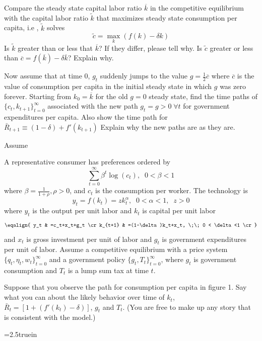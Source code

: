  Compare the steady state capital labor ratio $\overline{k}$ in the competitive equilibrium with the capital labor ratio $\tilde{k}$ that maximizes steady state consumption per capita, i.e ,
 $\tilde{k}$ solves $$\tilde{c}=\max_k \left( f(k)-\delta k \right) $$
Is $\tilde{k}$ greater than or less that $\overline{k}$? If they differ, please tell why. Is $\tilde{c}$ greater or less than $\overline{c} = f(\overline{k})-\delta  \overline{k}$? Explain why.
\medskip

 Now assume that at time 0, $g_t$ suddenly jumps to the value $g={\frac{1}{2}}\overline{c}$ where
$\overline{c}$ is the value of consumption per capita in the initial steady state in which $g$ was zero forever. Starting from $k_0 = \overline{k}$ for the old $g=0$ steady state, find the time paths of $\{c_t,k_{t+1}\}_{t=0}^\infty$ associated with the new path $g_t=g>0 \; \forall t$ for government expenditures per capita.
Also show the time path for $\bar R_{t+1} \equiv (1-\delta) + f'(k_{t+1})$
Explain why the new paths are as they are.



\medskip
{}
\medskip
\noindent
 Assume

 A representative consumer has preferences ordered by
 $$ \sum_{t=0}^\infty \beta^t \log(c_t), \;\;  0< \beta<1$$
 where $\beta = {\frac{1}{1+\rho}}, \rho>0$, and $c_t$ is the consumption per worker.
The technology is $$ y_t=f(k_t)=zk_t^\alpha, \;\; 0<\alpha<1, \;\; z>0 $$
where $y_t$ is the output per unit labor and $k_t$ is capital per unit labor
$$\eqalign{
y_t & =c_t+x_t+g_t \cr
  k_{t+1} & =(1-\delta)k_t+x_t, \;\;  0 < \delta<1 \cr
}$$
and $x_t$ is  gross investment per unit of labor and $g_t$ is  government expenditures per unit of labor.
Assume a competitive equilibrium with a price system $\{q_t,\eta_t,w_t\}_{t=0}^\infty$ and a government policy $\{g_t,T_t\}_{t=0}^\infty$, where
$g_t$ is government consumption and $T_t$ is a lump sum tax at time $t$.


Suppose that you observe the path for consumption per capita in figure 1. Say what you can about the likely behavior over time of $k_t$, $\bar R_t =[1 + (f'(k_t)-\delta)]$, $g_t$ and $T_t$. (You are free to make up any story that is consistent with the model.)

\medskip


\centerline{\epsfxsize=2.5truein}
\caption{Consumption per capita.}
\endfigure




